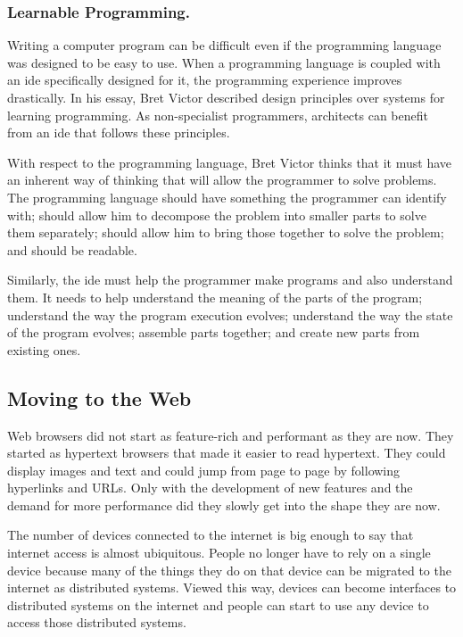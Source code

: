 \documentclass{./llncs2e/llncs}
\begin{document}
\subsubsection{Learnable Programming.}
	Writing a computer program can be difficult even if the programming language was designed to be easy to use. 
	When a programming language is coupled with an \ac{ide} specifically designed for it, the programming experience improves drastically. 
	In his essay\cite{victor2012learnable}, Bret Victor described design principles over systems for learning programming.
	As non-specialist programmers, architects can benefit from an \ac{ide} that follows these principles.

	With respect to the programming language, Bret Victor thinks that it must have an inherent way of thinking that will allow the programmer to solve problems.
	The programming language should have something the programmer can identify with; should allow him to decompose the problem into smaller parts to solve them separately; should allow him to bring those together to solve the problem; and should be readable.
	
	Similarly, the \ac{ide} must help the programmer make programs and also understand them.
	It needs to help understand the meaning of the parts of the program; understand the way the program execution evolves; understand the way the state of the program evolves; assemble parts together; and create new parts from existing ones.


\subsection{Moving to the Web}
	Web browsers did not start as feature-rich and performant as they are now.
	They started as hypertext browsers that made it easier to read hypertext.
	They could display images and text and could jump from page to page by following hyperlinks and URLs.
	Only with the development of new features and the demand for more performance did they slowly get into the shape they are now.

	The number of devices connected to the internet is big enough to say that internet access is almost ubiquitous.
	People no longer have to rely on a single device because many of the things they do on that device can be migrated to the internet as distributed systems.
	Viewed this way, devices can become interfaces to distributed systems on the internet and people can start to use any device to access those distributed systems.
\end{document}
